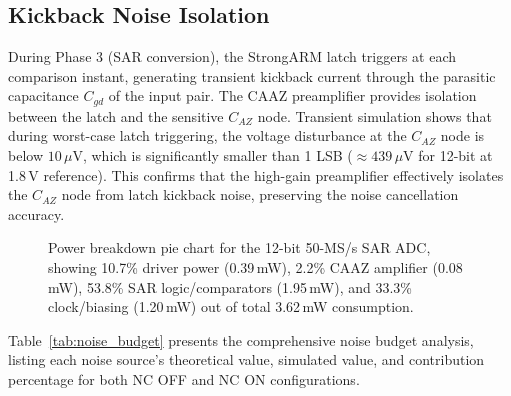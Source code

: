 \documentclass[journal]{IEEEtran}
\begin{document}
\subsection{Kickback Noise Isolation}
During Phase 3 (SAR conversion), the StrongARM latch triggers at each comparison instant, generating transient kickback current through the parasitic capacitance $C_{gd}$ of the input pair. The CAAZ preamplifier provides isolation between the latch and the sensitive $C_{AZ}$ node. Transient simulation shows that during worst-case latch triggering, the voltage disturbance at the $C_{AZ}$ node is below $10\,\mu$V, which is significantly smaller than 1 LSB ($\approx 439\,\mu$V for 12-bit at 1.8\,V reference). This confirms that the high-gain preamplifier effectively isolates the $C_{AZ}$ node from latch kickback noise, preserving the noise cancellation accuracy.

\begin{figure}[!t]
\centering
{}
\caption{Power breakdown pie chart for the 12-bit 50-MS/s SAR ADC, showing 10.7\% driver power (0.39\,mW), 2.2\% CAAZ amplifier (0.08\,mW), 53.8\% SAR logic/comparators (1.95\,mW), and 33.3\% clock/biasing (1.20\,mW) out of total 3.62\,mW consumption.}
\label{fig:power_breakdown}
\end{figure}

Table~\ref{tab:noise_budget} presents the comprehensive noise budget analysis, listing each noise source's theoretical value, simulated value, and contribution percentage for both NC OFF and NC ON configurations.
\end{document}
